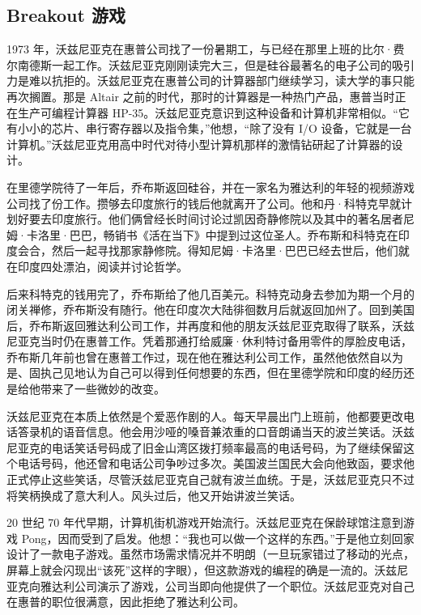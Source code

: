 \documentclass[12pt,UTF8]{ctexbook}
\begin{document}
\subsection{Breakout 游戏}


1973 年，沃兹尼亚克在惠普公司找了一份暑期工，与已经在那里上班的比尔·费尔南德斯一起工作。沃兹尼亚克刚刚读完大三，但是硅谷最著名的电子公司的吸引力是难以抗拒的。沃兹尼亚克在惠普公司的计算器部门继续学习，读大学的事只能再次搁置。那是 Altair 之前的时代，那时的计算器是一种热门产品，惠普当时正在生产可编程计算器 HP-35。沃兹尼亚克意识到这种设备和计算机非常相似。“它有小小的芯片、串行寄存器以及指令集，”他想，“除了没有 I/O 设备，它就是一台计算机。”沃兹尼亚克用高中时代对待小型计算机那样的激情钻研起了计算器的设计。

在里德学院待了一年后，乔布斯返回硅谷，并在一家名为雅达利的年轻的视频游戏公司找了份工作。攒够去印度旅行的钱后他就离开了公司。他和丹·科特克早就计划好要去印度旅行。他们俩曾经长时间讨论过凯因奇静修院以及其中的著名居者尼姆·卡洛里·巴巴，畅销书《活在当下》中提到过这位圣人。乔布斯和科特克在印度会合，然后一起寻找那家静修院。得知尼姆·卡洛里·巴巴已经去世后，他们就在印度四处漂泊，阅读并讨论哲学。

后来科特克的钱用完了，乔布斯给了他几百美元。科特克动身去参加为期一个月的闭关禅修，乔布斯没有随行。他在印度次大陆徘徊数月后就返回加州了。回到美国后，乔布斯返回雅达利公司工作，并再度和他的朋友沃兹尼亚克取得了联系，沃兹尼亚克当时仍在惠普工作。凭着那通打给威廉·休利特讨备用零件的厚脸皮电话，乔布斯几年前也曾在惠普工作过，现在他在雅达利公司工作，虽然他依然自以为是、固执己见地认为自己可以得到任何想要的东西，但在里德学院和印度的经历还是给他带来了一些微妙的改变。

沃兹尼亚克在本质上依然是个爱恶作剧的人。每天早晨出门上班前，他都要更改电话答录机的语音信息。他会用沙哑的嗓音兼浓重的口音朗诵当天的波兰笑话。沃兹尼亚克的电话笑话号码成了旧金山湾区拨打频率最高的电话号码，为了继续保留这个电话号码，他还曾和电话公司争吵过多次。美国波兰国民大会向他致函，要求他正式停止这些笑话，尽管沃兹尼亚克自己就有波兰血统。于是，沃兹尼亚克只不过将笑柄换成了意大利人。风头过后，他又开始讲波兰笑话。

20 世纪 70 年代早期，计算机街机游戏开始流行。沃兹尼亚克在保龄球馆注意到游戏 Pong，因而受到了启发。他想：“我也可以做一个这样的东西。”于是他立刻回家设计了一款电子游戏。虽然市场需求情况并不明朗（一旦玩家错过了移动的光点，屏幕上就会闪现出“该死”这样的字眼），但这款游戏的编程的确是一流的。沃兹尼亚克向雅达利公司演示了游戏，公司当即向他提供了一个职位。沃兹尼亚克对自己在惠普的职位很满意，因此拒绝了雅达利公司。
\end{document}
